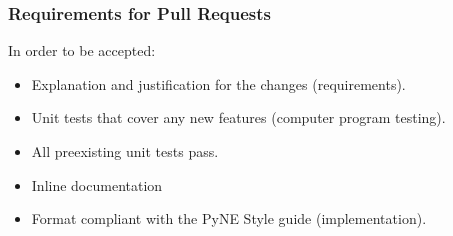 \documentclass[12pt]{beamer}
\begin{document}
\begin{frame}
\begin{columns}
\begin{column}{0.5\textwidth}
\end{column}
\end{columns}


\end{frame}

\begin{frame}
\frametitle{Requirements for Pull Requests}


In order to be accepted:

\begin{itemize}
\item{Explanation and justification for the changes (\alert{requirements}).}
\item{Unit tests that cover any new features (\alert{computer program testing}).}
\item{All preexisting unit tests pass.}
\item{Inline documentation}
\item{Format compliant with the PyNE Style guide (\alert{implementation}).}
\end{itemize}

\end{frame}
\end{document}
